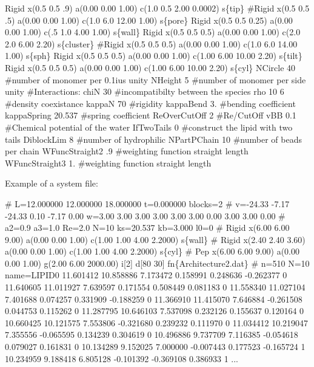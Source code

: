 \begin{DoxyCode}
Rigid x(0.5 0.5 .9) a(0.00 0.00 1.00) c(1.0 0.5 2.00 0.0002) s\{tip\}
\textcolor{preprocessor}{#Rigid x(0.5 0.5 .5) a(0.00 0.00 1.00) c(1.0 6.0 12.00 1.00) s\{pore\}}
Rigid x(0.5 0.5 0.25) a(0.00 0.00 1.00) c(.5 1.0 4.00 1.00) s\{wall\}
Rigid x(0.5 0.5 0.5) a(0.00 0.00 1.00) c(2.0 2.0 6.00 2.20) s\{cluster\}
\textcolor{preprocessor}{#Rigid x(0.5 0.5 0.5) a(0.00 0.00 1.00) c(1.0 6.0 14.00 1.00) s\{sph\}}
Rigid x(0.5 0.5 0.5) a(0.00 0.00 1.00) c(1.00 6.00 10.00 2.20) s\{tilt\}
Rigid x(0.5 0.5 0.5) a(0.00 0.00 1.00) c(1.00 6.00 10.00 2.20) s\{cyl\}
NCircle 40        #number of monomer per 0.1ius unity
NHeight 5       #number of monomer per side unity
\textcolor{preprocessor}{#Interactions:}
chiN 30             #incompatibilty between the species
rho 10 6               #density coexistance
kappaN 70           #rigidity
kappaBend    3.     #bending coefficient
kappaSpring 20.537  #spring coefficient
ReOverCutOff 2      #Re/CutOff
vBB 0.1            #Chemical potential of the water
IfTwoTails 0        #construct the lipid with two tails
DiblockLim   8     #number of hydrophilic
NPartPChain  10   #number of beads per chain
WFuncStraight2 .9   #weighting \textcolor{keyword}{function} straight length
WFuncStraight3 1.   #weighting \textcolor{keyword}{function} straight length
\end{DoxyCode}
 Example of a system file\+: 
\begin{DoxyCode}
\textcolor{preprocessor}{# L=12.000000 12.000000 18.000000 t=0.000000 blocks=2}
\textcolor{preprocessor}{# v=-24.33 -7.17 -24.33 0.10 -7.17 0.00 w=3.00 3.00 3.00 3.00 3.00 3.00 0.00 3.00 3.00 0.00}
\textcolor{preprocessor}{# a2=0.9 a3=1.0 Re=2.0 N=10 ks=20.537 kb=3.000 l0=0}
\textcolor{preprocessor}{# Rigid x(6.00 6.00 9.00) a(0.00 0.00 1.00) c(1.00 1.00 4.00 2.2000) s\{wall\}}
\textcolor{preprocessor}{# Rigid x(2.40 2.40 3.60) a(0.00 0.00 1.00) c(1.00 1.00 4.00 2.2000) s\{cyl\}}
\textcolor{preprocessor}{# Pep x(6.00 6.00 9.00) a(0.00 0.00 1.00) g(2.00 6.00 2000.00) i[2] d[80 30] fn\{Architecture2.dat\}}
\textcolor{preprocessor}{# n=510 N=10 name=LIPID0}
11.601412 10.858886 7.173472 0.158991 0.248636 -0.262377  0 
11.640605 11.011927 7.639597 0.171554 0.508449 0.081183  0 
11.558340 11.027104 7.401688 0.074257 0.331909 -0.188259  0 
11.366910 11.415070 7.646884 -0.261508 0.044753 0.115262  0 
11.287795 10.646103 7.537098 0.232126 0.155637 0.120164  0 
10.660425 10.121575 7.553806 -0.321680 0.239232 0.111970  0 
11.034412 10.219047 7.355556 -0.065595 0.134239 0.304619  0 
10.496886 9.737709 7.116385 -0.054618 0.079027 0.161831  0 
10.134289 9.152025 7.000000 -0.007443 0.177523 -0.165724  1 
10.234959 9.188418 6.805128 -0.101392 -0.369108 0.386933  1 
...
\end{DoxyCode}
